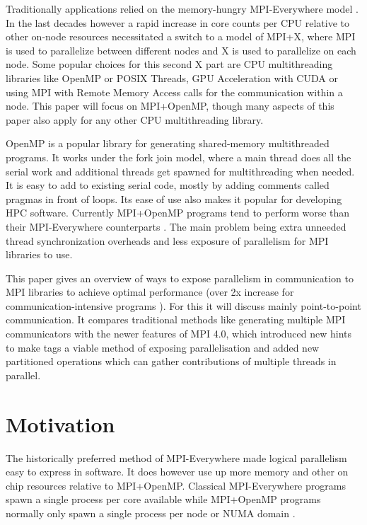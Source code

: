 \documentclass[sigconf]{acmart}
\begin{document}
Traditionally applications relied on the memory-hungry MPI-Everywhere model \cite{zambreLessonsLearned2022}.
In the last decades however a rapid increase in core counts per CPU relative to other on-node resources necessitated a switch to a model of MPI+X,
where MPI is used to parallelize between different nodes and X is used to parallelize on each node.
Some popular choices for this second X part are CPU multithreading libraries like OpenMP or POSIX Threads, GPU Acceleration with CUDA or using MPI with Remote Memory Access calls for the communication within a node.
This paper will focus on MPI+OpenMP, though many aspects of this paper also apply for any other CPU multithreading library.

OpenMP is a popular library for generating shared-memory multithreaded programs.
It works under the fork join model, where a main thread does all the serial work and additional threads get spawned for multithreading when needed.
It is easy to add to existing serial code, mostly by adding comments called pragmas in front of loops.
Its ease of use also makes it popular for developing HPC software.
Currently MPI+OpenMP programs tend to perform worse than their MPI-Everywhere counterparts \cite{zambreLessonsLearned2022,zambreLogicalParallel2021}.
The main problem being extra unneeded thread synchronization overheads \cite{zambreLessonsLearned2022} and less exposure of parallelism for MPI libraries to use.

This paper gives an overview of ways to expose parallelism in communication to MPI libraries to achieve optimal performance (over 2x increase for communication-intensive programs \cite{zambreLogicalParallel2021}).
For this it will discuss mainly point-to-point communication. It compares traditional methods like generating multiple MPI communicators with the newer features of MPI 4.0, which introduced new hints to make tags a viable method of exposing parallelisation and added new partitioned operations which can gather contributions of multiple threads in parallel.

\section{Motivation}
The historically preferred method of MPI-Everywhere made logical parallelism easy to express in software.
It does however use up more memory and other on chip resources relative to MPI+OpenMP.
Classical MPI-Everywhere programs spawn a single process per core available while MPI+OpenMP programs normally only spawn a single process per node or NUMA domain \cite{zambreLessonsLearned2022}.
\end{document}
